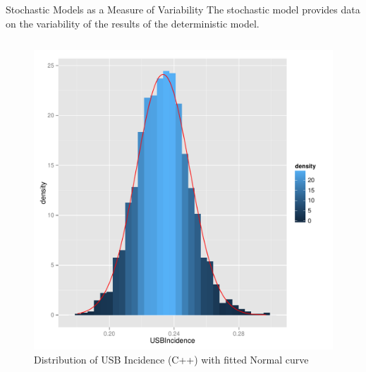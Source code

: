 \documentclass[final]{beamer}
\begin{document}
\begin{frame}
\begin{columns}
\begin{column}{.3\textwidth}
      \begin{block}{Stochastic Models as a Measure of Variability}
        The stochastic model provides data on the variability of the results
        of the deterministic model.
        \begin{block}{}
          \begin{column}{.45\textwidth}
            \begin{figure}[h]
              \begin{center}
                \includegraphics[width=\textwidth]{IN0dist}
              \end{center}
              \caption{Distribution of USB Incidence (C++) with fitted Normal curve}
              \label{fig:IN0dist}
            \end{figure}
          \end{column}
          \begin{column}{.45\textwidth}
            \begin{figure}[h]
              \begin{center}

\end{center}
\end{figure}
\end{column}
\end{block}
\end{block}
\end{column}
\end{columns}
\end{frame}
\end{document}
